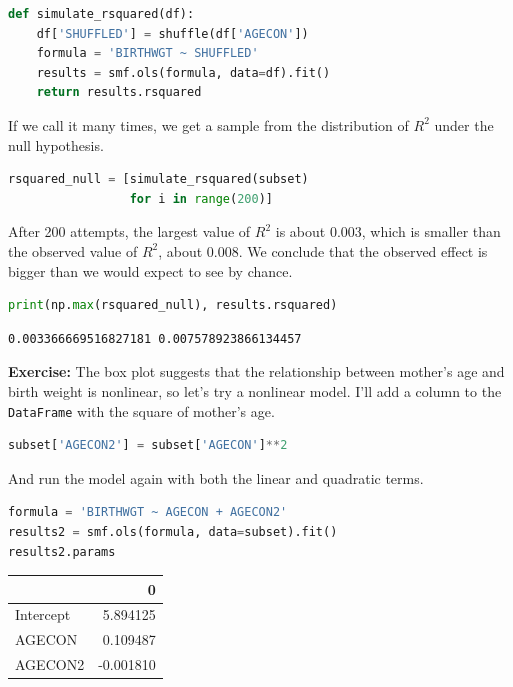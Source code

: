 \begin{lstlisting}[language=Python,style=source]
def simulate_rsquared(df):
    df['SHUFFLED'] = shuffle(df['AGECON'])
    formula = 'BIRTHWGT ~ SHUFFLED'
    results = smf.ols(formula, data=df).fit()
    return results.rsquared
\end{lstlisting}

If we call it many times, we get a sample from the distribution of
\(R^2\) under the null hypothesis.

\begin{lstlisting}[language=Python,style=source]
rsquared_null = [simulate_rsquared(subset)
                 for i in range(200)]
\end{lstlisting}

After 200 attempts, the largest value of \(R^2\) is about 0.003, which
is smaller than the observed value of \(R^2\), about 0.008. We conclude
that the observed effect is bigger than we would expect to see by
chance.

\begin{lstlisting}[language=Python,style=source]
print(np.max(rsquared_null), results.rsquared)
\end{lstlisting}

\begin{lstlisting}[style=output]
0.003366669516827181 0.007578923866134457
\end{lstlisting}

\textbf{Exercise:} The box plot suggests that the relationship between
mother's age and birth weight is nonlinear, so let's try a nonlinear
model. I'll add a column to the \passthrough{\lstinline!DataFrame!} with
the square of mother's age.

\begin{lstlisting}[language=Python,style=source]
subset['AGECON2'] = subset['AGECON']**2
\end{lstlisting}

And run the model again with both the linear and quadratic terms.

\begin{lstlisting}[language=Python,style=source]
formula = 'BIRTHWGT ~ AGECON + AGECON2'
results2 = smf.ols(formula, data=subset).fit()
results2.params
\end{lstlisting}

\begin{tabular}{lr}
\toprule
{} &         0 \\
\midrule
Intercept &  5.894125 \\
AGECON    &  0.109487 \\
AGECON2   & -0.001810 \\
\bottomrule
\end{tabular}

